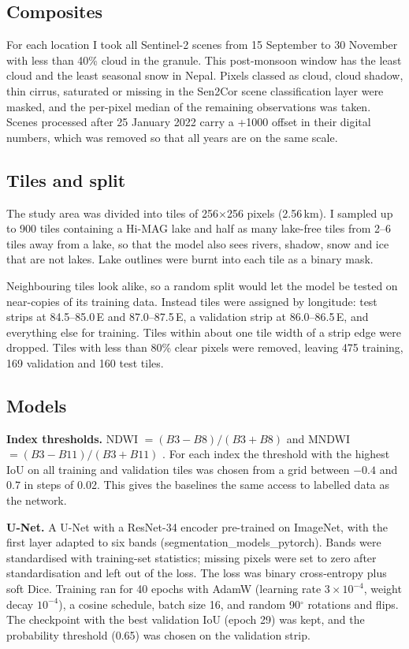 \documentclass[11pt,a4paper]{article}
\begin{document}
\subsection{Composites}
For each location I took all Sentinel-2 scenes from 15 September to 30 November with less than 40\% cloud in the granule. This post-monsoon window has the least cloud and the least seasonal snow in Nepal. Pixels classed as cloud, cloud shadow, thin cirrus, saturated or missing in the Sen2Cor scene classification layer were masked, and the per-pixel median of the remaining observations was taken. Scenes processed after 25 January 2022 carry a +1000 offset in their digital numbers, which was removed so that all years are on the same scale.

\subsection{Tiles and split}
The study area was divided into tiles of 256$\times$256 pixels (2.56\,km). I sampled up to 900 tiles containing a Hi-MAG lake and half as many lake-free tiles from 2--6 tiles away from a lake, so that the model also sees rivers, shadow, snow and ice that are not lakes. Lake outlines were burnt into each tile as a binary mask.

Neighbouring tiles look alike, so a random split would let the model be tested on near-copies of its training data. Instead tiles were assigned by longitude: test strips at 84.5--85.0\,E and 87.0--87.5\,E, a validation strip at 86.0--86.5\,E, and everything else for training. Tiles within about one tile width of a strip edge were dropped. Tiles with less than 80\% clear pixels were removed, leaving 475 training, 169 validation and 160 test tiles.

\subsection{Models}
\textbf{Index thresholds.} NDWI $=(B3-B8)/(B3+B8)$ \cite{mcfeeters1996} and MNDWI $=(B3-B11)/(B3+B11)$ \cite{xu2006}. For each index the threshold with the highest IoU on all training and validation tiles was chosen from a grid between $-0.4$ and $0.7$ in steps of 0.02. This gives the baselines the same access to labelled data as the network.

\textbf{U-Net.} A U-Net \cite{ronneberger2015} with a ResNet-34 encoder \cite{he2016} pre-trained on ImageNet, with the first layer adapted to six bands (segmentation\_models\_pytorch). Bands were standardised with training-set statistics; missing pixels were set to zero after standardisation and left out of the loss. The loss was binary cross-entropy plus soft Dice. Training ran for 40 epochs with AdamW (learning rate $3\times10^{-4}$, weight decay $10^{-4}$), a cosine schedule, batch size 16, and random 90$^\circ$ rotations and flips. The checkpoint with the best validation IoU (epoch 29) was kept, and the probability threshold (0.65) was chosen on the validation strip.
\end{document}
